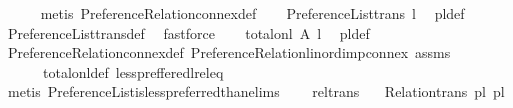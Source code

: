 \begin{isabellebody}
\ \ \ \ \isamarkupfalse%
\ {\isacharparenleft}{\kern0pt}metis\ Preference{\isacharunderscore}{\kern0pt}Relation{\isachardot}{\kern0pt}connex{\isacharunderscore}{\kern0pt}def{\isacharparenright}{\kern0pt}\isanewline
{}\isamarkupfalse%
\isanewline
\ \ \isamarkupfalse%
\ {\isachardoublequoteopen}Preference{\isacharunderscore}{\kern0pt}List{\isachardot}{\kern0pt}trans\ l{\isachardoublequoteclose}\ \isamarkupfalse%
\ pl{\isacharunderscore}{\kern0pt}{\isasymalpha}{\isacharunderscore}{\kern0pt}def\isanewline
\ \ \ \ \isamarkupfalse%
\ Preference{\isacharunderscore}{\kern0pt}List{\isachardot}{\kern0pt}trans{\isacharunderscore}{\kern0pt}def\ \isamarkupfalse%
\ fastforce\isanewline
{}\isamarkupfalse%
\isanewline
\ \ \isamarkupfalse%
\ {\isachardoublequoteopen}total{\isacharunderscore}{\kern0pt}on{\isacharunderscore}{\kern0pt}l\ A\ l{\isachardoublequoteclose}\ \isamarkupfalse%
\ pl{\isacharunderscore}{\kern0pt}{\isasymalpha}{\isacharunderscore}{\kern0pt}def\ \isanewline
\ \ \ \ \isamarkupfalse%
\ Preference{\isacharunderscore}{\kern0pt}Relation{\isachardot}{\kern0pt}connex{\isacharunderscore}{\kern0pt}def\ Preference{\isacharunderscore}{\kern0pt}Relation{\isachardot}{\kern0pt}lin{\isacharunderscore}{\kern0pt}ord{\isacharunderscore}{\kern0pt}imp{\isacharunderscore}{\kern0pt}connex\ assms\ \isanewline
\ \ \ \ \ \ total{\isacharunderscore}{\kern0pt}on{\isacharunderscore}{\kern0pt}l{\isacharunderscore}{\kern0pt}def\ less{\isacharunderscore}{\kern0pt}preffered{\isacharunderscore}{\kern0pt}l{\isacharunderscore}{\kern0pt}rel{\isacharunderscore}{\kern0pt}eq\isanewline
\ \ \ \ \isamarkupfalse%
\ {\isacharparenleft}{\kern0pt}metis\ Preference{\isacharunderscore}{\kern0pt}List{\isachardot}{\kern0pt}is{\isacharunderscore}{\kern0pt}less{\isacharunderscore}{\kern0pt}preferred{\isacharunderscore}{\kern0pt}than{\isachardot}{\kern0pt}elims{\isacharparenleft}{\kern0pt}{}{\isacharparenright}{\kern0pt}{\isacharparenright}{\kern0pt}\ \ \ \isanewline
{}\isamarkupfalse%
%
\endisatagproof
{\isafoldproof}%
%
\isadelimproof
\isanewline
%
\endisadelimproof
\isanewline
{}\isamarkupfalse%
\ rel{\isacharunderscore}{\kern0pt}trans{\isacharcolon}{\kern0pt}\isanewline
\ \ \ {\isachardoublequoteopen}Relation{\isachardot}{\kern0pt}trans\ {\isacharparenleft}{\kern0pt}pl{\isacharunderscore}{\kern0pt}{\isasymalpha}\ pl{\isacharparenright}{\kern0pt}{\isachardoublequoteclose}\isanewline

\end{isabellebody}
